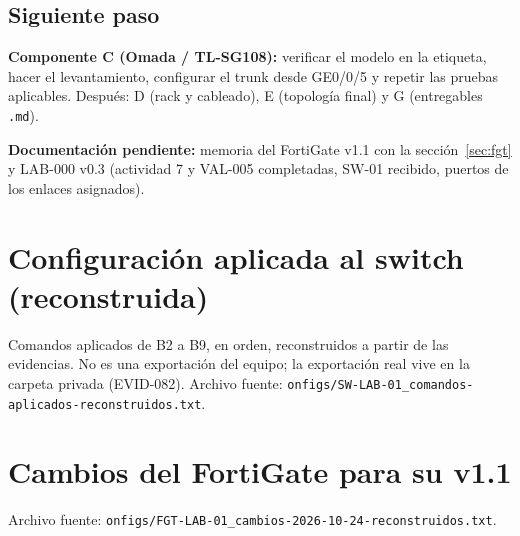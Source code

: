 \documentclass[11pt,a4paper]{article}
\newcommand{\fn}[1]{\texttt{\fnbreaks#1\fnend}}
\def\fnbreaks#1\fnend{\begingroup\fnactive\scantokens{#1\noexpand}\endgroup}
\gdef\fnactive{\catcode`\-=\active\catcode`\/=\active
  \def-{\char`\-\allowbreak}\def/{\char`\/\allowbreak}\let\_\fnus}
\newcommand{\fnus}{\textunderscore\allowbreak}
\begin{document}
\newpage
\subsection{Siguiente paso}
\textbf{Componente C (Omada / TL-SG108):} verificar el modelo en la etiqueta, hacer el levantamiento, configurar el trunk desde GE0/0/5 y repetir las pruebas aplicables. Después: D (rack y cableado), E (topología final) y G (entregables \texttt{.md}).

\textbf{Documentación pendiente:} memoria del FortiGate v1.1 con la sección~\ref{sec:fgt} y LAB-000 v0.3 (actividad 7 y VAL-005 completadas, SW-01 recibido, puertos de los enlaces asignados).

\appendix
\renewcommand{\thesection}{\Alph{section}}
\titleformat{\section}{\Large\bfseries\color{navy}}{Apéndice \thesection.}{0.6em}{}

\section{Configuración aplicada al switch (reconstruida)}\label{ap:config}
Comandos aplicados de B2 a B9, en orden, reconstruidos a partir de las evidencias. No es una exportación del equipo; la exportación real vive en la carpeta privada (EVID-082). Archivo fuente: \fn{configs/SW-LAB-01\_comandos-aplicados-reconstruidos.txt}.



\section{Cambios del FortiGate para su v1.1}\label{ap:fgt}
Archivo fuente: \fn{configs/FGT-LAB-01\_cambios-2026-10-24-reconstruidos.txt}.



\newpage
\end{document}
